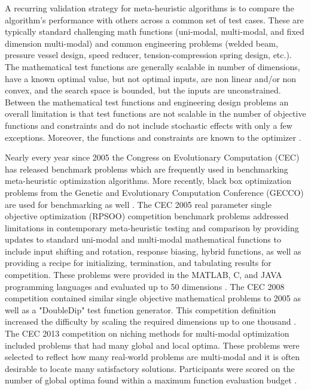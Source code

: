 \documentclass[a4paper]{article}
\begin{document}
A recurring validation strategy for meta-heuristic algorithms is to compare the algorithm's performance with others across a common set of test cases. These are typically standard challenging math functions (uni-modal, multi-modal, and fixed dimension multi-modal) and common engineering problems (welded beam, pressure vessel design, speed reducer, tension-compression spring design, etc.). The mathematical test functions are generally scalable in number of dimensions, have a known optimal value, but not optimal inputs, are non linear and/or non convex, and the search space is bounded, but the inputs are unconstrained. Between the mathematical test functions and engineering design problems an overall limitation is that test functions are not scalable in the number of objective functions and constraints and do not include stochastic effects with only a few exceptions. Moreover, the functions and constraints are known to the optimizer \cite{sharma_metaheuristic_2023}.

Nearly every year since 2005 the Congress on Evolutionary Computation (CEC) has released benchmark problems which are frequently used in benchmarking meta-heuristic optimization algorithms. More recently, black box optimization problems from the Genetic and Evolutionary Computation Conference (GECCO) are used for benchmarking as well \cite{sharma_metaheuristic_2023}. The CEC 2005 real parameter single objective optimization (RPSOO) competition benchmark problems addressed limitations in contemporary meta-heuristic testing and comparison by providing updates to standard uni-modal and multi-modal mathematical functions to include input shifting and rotation, response biasing, hybrid functions, as well as providing a recipe for initializing, termination, and tabulating results for competition. These problems were provided in the MATLAB, C, and JAVA programming languages and evaluated up to 50 dimensions \cite{liang_problem_2005}. The CEC 2008 competition contained similar single objective mathematical problems to 2005 as well as a "DoubleDip" test function generator. This competition definition increased the difficulty by scaling the required dimensions up to one thousand \cite{tang_benchmark_2008}. The CEC 2013 competition on niching methods for multi-modal optimization included problems that had many global and local optima. These problems were selected to reflect how many real-world problems are multi-modal and it is often desirable to locate many satisfactory solutions. Participants were scored on the number of global optima found within a maximum function evaluation budget \cite{li_benchmark_2013}.
\end{document}
